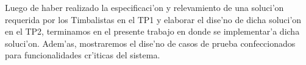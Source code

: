 Luego de haber realizado la especificaci'on y relevamiento de una soluci'on requerida por los Timbalistas en el TP1 y elaborar el dise'no de dicha soluci'on en el TP2, terminamos en el presente trabajo en donde se implementar'a dicha soluci'on. Adem'as, mostraremos el dise'no de casos de prueba confeccionados para funcionalidades cr'iticas del sistema.
